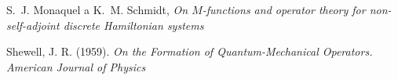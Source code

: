 \begin{thebibliography}{10}

    S.~J. Monaquel a K.~M. Schmidt, \textit{On $M$-functions and operator
      theory for non-self-adjoint discrete Hamiltonian systems}

        Shewell, J. R. (1959). \textit{On the Formation of Quantum-Mechanical 
        Operators. American Journal of Physics}

\end{thebibliography}

\cleardoublepage
